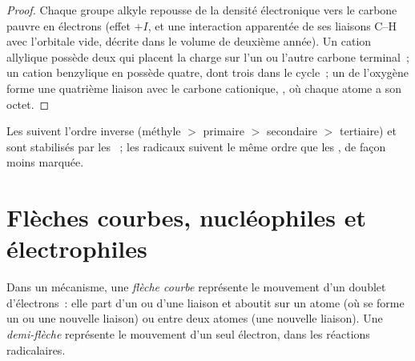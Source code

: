 \begin{proof}
Chaque groupe alkyle repousse de la densité électronique vers le carbone
pauvre en électrons (effet $+I$, et une interaction apparentée de ses
liaisons C--H avec l'orbitale vide, décrite dans le volume de deuxième
année). Un cation allylique possède deux  qui placent
la charge sur l'un ou l'autre carbone terminal~; un cation benzylique en
possède quatre, dont trois dans le cycle~; un  de
l'oxygène forme une quatrième liaison avec le carbone cationique,
, où chaque atome a son octet.
\end{proof}

Les  suivent l'ordre inverse (méthyle $>$ primaire $>$
secondaire
$>$ tertiaire) et sont stabilisés par les ~; les
radicaux suivent le même ordre que les , de façon moins
marquée.

\section{Flèches courbes, nucléophiles et électrophiles}

\begin{definition}\label{def:b1:electronic-effects:curly-arrow}
Dans un mécanisme, une \emph{flèche courbe} représente le
mouvement d'un doublet d'électrons~: elle part d'un  ou
d'une liaison et aboutit sur un atome (où se forme un 
ou une nouvelle liaison) ou entre deux atomes (une nouvelle liaison).
Une \emph{demi-flèche} représente le mouvement d'un seul électron,
dans les réactions radicalaires.
\end{definition}

